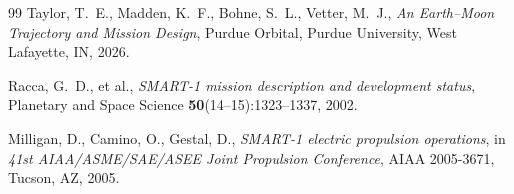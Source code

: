 \documentclass[11pt,a4paper]{article}
\theoremstyle{plain}
\begin{document}
\begin{thebibliography}{99}
  Taylor, T.~E., Madden, K.~F., Bohne, S.~L., Vetter, M.~J.,
  \emph{An Earth--Moon Trajectory and Mission Design},
  Purdue Orbital, Purdue University, West Lafayette, IN, 2026.

  Racca, G.~D., et al., \emph{SMART-1 mission description and
   development status}, Planetary and Space Science
  \textbf{50}(14--15):1323--1337, 2002.

  Milligan, D., Camino, O., Gestal, D., \emph{SMART-1 electric
   propulsion operations}, in \emph{41st AIAA/ASME/SAE/ASEE Joint
   Propulsion Conference}, AIAA 2005-3671, Tucson, AZ, 2005.

\end{thebibliography}
\end{document}
